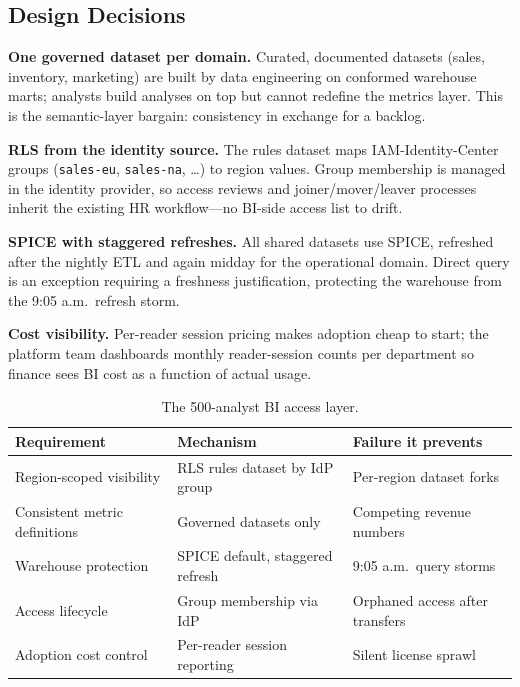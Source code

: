 \subsection{Design Decisions}
\textbf{One governed dataset per domain.} Curated, documented datasets (sales, inventory, marketing) are built by data engineering on conformed warehouse marts; analysts build analyses on top but cannot redefine the metrics layer. This is the semantic-layer bargain: consistency in exchange for a backlog.

\textbf{RLS from the identity source.} The rules dataset maps IAM-Identity-Center groups (\texttt{sales-eu}, \texttt{sales-na}, \ldots) to region values. Group membership is managed in the identity provider, so access reviews and joiner/mover/leaver processes inherit the existing HR workflow---no BI-side access list to drift.

\textbf{SPICE with staggered refreshes.} All shared datasets use SPICE, refreshed after the nightly ETL and again midday for the operational domain. Direct query is an exception requiring a freshness justification, protecting the warehouse from the 9:05 a.m.\ refresh storm.

\textbf{Cost visibility.} Per-reader session pricing makes adoption cheap to start; the platform team dashboards monthly reader-session counts per department so finance sees BI cost as a function of actual usage.

\begin{table}[H]
\centering
\small
\begin{tabular}{@{}p{3.6cm}p{4.4cm}p{4.2cm}@{}}
\toprule
\textbf{Requirement} & \textbf{Mechanism} & \textbf{Failure it prevents} \\
\midrule
Region-scoped visibility & RLS rules dataset by IdP group & Per-region dataset forks \\
Consistent metric definitions & Governed datasets only & Competing revenue numbers \\
Warehouse protection & SPICE default, staggered refresh & 9:05 a.m.\ query storms \\
Access lifecycle & Group membership via IdP & Orphaned access after transfers \\
Adoption cost control & Per-reader session reporting & Silent license sprawl \\
\bottomrule
\end{tabular}
\caption{The 500-analyst BI access layer.}
\label{tab:ch16-bi-access}
\end{table}

